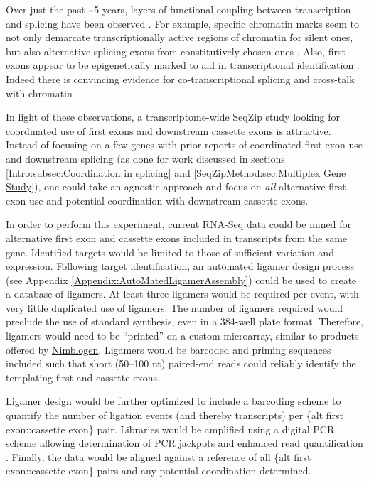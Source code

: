     Over just the past \textasciitilde5 years, layers of functional coupling between transcription and splicing have been observed \citep{Merkhofer2014}. For example, specific chromatin marks seem to not only demarcate transcriptionally active regions of chromatin for silent ones, but also alternative splicing exons from constitutively chosen ones \citep{Kolasinska-Zwierz2009}. Also, first exons appear to be epigenetically marked to aid in transcriptional identification \citep{Bieberstein2012}. Indeed there is convincing evidence for co-transcriptional splicing and cross-talk with chromatin \citep{Brown2012,Luco2011a,Schwartz2010}.

    In light of these observations, a transcriptome-wide SeqZip study looking for coordinated use of first exons and downstream cassette exons is attractive. Instead of focusing on a few genes with prior reports of coordinated first exon use and downstream splicing (as done for work discussed in sections \ref{Intro:subsec:Coordination in splicing} and \ref{SeqZipMethod:sec:Multiplex Gene Study}), one could take an agnostic approach and focus on \textit{all} alternative first exon use and potential coordination with downstream cassette exons.

    In order to perform this experiment, current RNA-Seq data could be mined for alternative first exon and cassette exons included in transcripts from the same gene. Identified targets would be limited to those of sufficient variation and expression. Following target identification, an automated ligamer design process (see Appendix \ref{Appendix:AutoMatedLigamerAssembly}) could be used to create a database of ligamers. At least three ligamers would be required per event, with very little duplicated use of ligamers. The number of ligamers required would preclude the use of standard synthesis, even in a 384-well plate format. Therefore, ligamers would need to be ``printed'' on a custom microarray, similar to products offered by \href{http://www.nimblegen.com/}{Nimblogen}. Ligamers would be barcoded and priming sequences included such that short (50--100 nt) paired-end reads could reliably identify the templating first and cassette exons.

    Ligamer design would be further optimized to include a barcoding scheme to quantify the number of ligation events (and thereby transcripts) per \{alt first exon::cassette exon\} pair. Libraries would be amplified using a digital PCR scheme allowing determination of PCR jackpots and enhanced read quantification \citep{Shiroguchi2012a}. Finally, the data would be aligned against a reference of all \{alt first exon::cassette exon\} pairs and any potential coordination determined.

